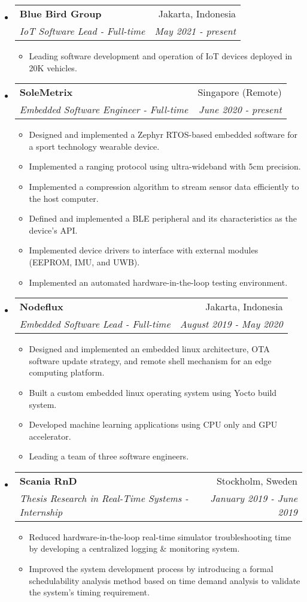 \documentclass[letterpaper,9pt]{article}
\makeatletter
\newcommand{\resitem}[1]{\item #1 \vspace{-2pt}}
\newcommand{\ressubheading}[4]{
\begin{tabular*}{7.0in}{l@{\cftdotfill{\cftsecdotsep}\extracolsep{\fill}}r}
		\textbf{#1} & #2 \\
        \textit{#3} & \textit{#4} \\
\end{tabular*}\vspace{-6.3pt}}
\makeatother
\begin{document}
\begin{itemize}
  \item 
    \ressubheading{Blue Bird Group}{Jakarta, Indonesia}{IoT Software Lead - Full-time}{May 2021 - present}
    \begin{itemize}
      \item Leading software development and operation of IoT devices deployed in 20K vehicles. 
    \end{itemize}
  
  \item
        \ressubheading{SoleMetrix}{Singapore (Remote)}{Embedded Software Engineer - Full-time}{June 2020 - present}
        \begin{itemize}
          \resitem{Designed and implemented a Zephyr RTOS-based embedded software for a sport technology wearable device.}
          \resitem{Implemented a ranging protocol using ultra-wideband with 5cm precision.}
          \resitem{Implemented a compression algorithm to stream sensor data efficiently to the host computer.}
          \resitem{Defined and implemented a BLE peripheral and its characteristics as the device's API.}
          \resitem{Implemented device drivers to interface with external modules (EEPROM, IMU, and UWB).}
          \resitem{Implemented an automated hardware-in-the-loop testing environment.}
        \end{itemize}

  \item
        \ressubheading{Nodeflux}{Jakarta, Indonesia}{Embedded Software Lead - Full-time}{August 2019 - May 2020}
        \begin{itemize}
          \resitem{Designed and implemented an embedded linux architecture, OTA software update strategy, and remote shell mechanism for an edge computing platform.}
          \resitem{Built a custom embedded linux operating system using Yocto build system.}
          \resitem{Developed machine learning applications using CPU only and GPU accelerator.}
          \resitem{Leading a team of three software engineers.}
        \end{itemize}

  \item
        \ressubheading{Scania RnD}{Stockholm, Sweden}{Thesis Research in Real-Time Systems - Internship}{January 2019 - June 2019}
        \begin{itemize}
          \resitem{Reduced hardware-in-the-loop real-time simulator troubleshooting time by developing a centralized logging \& monitoring system.}
          \resitem{Improved the system development process by introducing a formal schedulability analysis method based on time demand analysis to validate the system's timing requirement.}
        \end{itemize}


\end{itemize}
\end{document}
